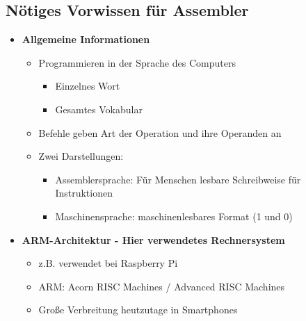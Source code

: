 \subsection{Nötiges Vorwissen für Assembler} 
    
    \begin{itemize}
        \item \textbf{Allgemeine Informationen}
            \begin{itemize}
                \item Programmieren in der Sprache des Computers
                    \begin{itemize}
                        \item {} Einzelnes Wort
                        \item {} Gesamtes Vokabular
                    \end{itemize}
                \item Befehle geben Art der Operation und ihre Operanden an 
                \item Zwei Darstellungen:
                    \begin{itemize}
                        \item Assemblersprache: Für Menschen lesbare Schreibweise für Instruktionen
                        \item Maschinensprache: maschinenlesbares Format (1 und 0)
                    \end{itemize}
            \end{itemize}
        
        \item \textbf{ARM-Architektur - Hier verwendetes Rechnersystem}
            \begin{itemize}
                \item z.B. verwendet bei Raspberry Pi 
                \item ARM: Acorn RISC Machines / Advanced RISC Machines 
                \item Große Verbreitung heutzutage in Smartphones
            \end{itemize}


\end{itemize}
